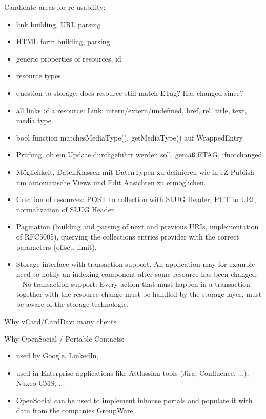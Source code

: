 \documentclass[12pt,a4paper]{scrartcl}		%
\begin{document}
Candidate areas for re-usability:
\begin{itemize}
\item link building, URL parsing
\item HTML form building, parsing
\item generic properties of resources, id
\item resource types
\item question to storage: does resource still match ETag? Has changed since?
\item all links of a resource: Link: intern/extern/undefined, href, rel, title, text, media type
\item bool function matchesMediaType(), getMediaType() auf WrappedEntry
\item Prüfung, ob ein Update durchgeführt werden soll, gemäß ETAG, ifnotchanged
\item Möglichkeit, DatenKlassen mit DatenTypen zu definieren wie in eZ Publish um automatische Views und Edit Ansichten zu ermöglichen.
\item Creation of resources: POST to collection with SLUG Header, PUT to URI, normalization of SLUG Header
\item Pagination (building and parsing of next and previous URIs, implementation of RFC5005), querying the collections entries provider with the correct parameters (offset, limit).
\item Storage interface with transaction support. An application may for example need to notify an indexing component after some resource has been changed. -- No transaction support: Every action that must happen in a transaction together with the resource change must be handled by the storage layer, must be aware of the storage technologie.
\end{itemize}



\appendix

Why vCard/CardDav: many clients

Why OpenSocial / Portable Contacts:
\begin{itemize}
\item used by Google, LinkedIn,
\item used in Enterprise applications like Attlassian tools (Jira, Confluence, ...), Nuxeo CMS, ...
\item OpenSocial can be used to implement inhouse portals and populate it with data from the companies GroupWare
\end{itemize}
\end{document}
